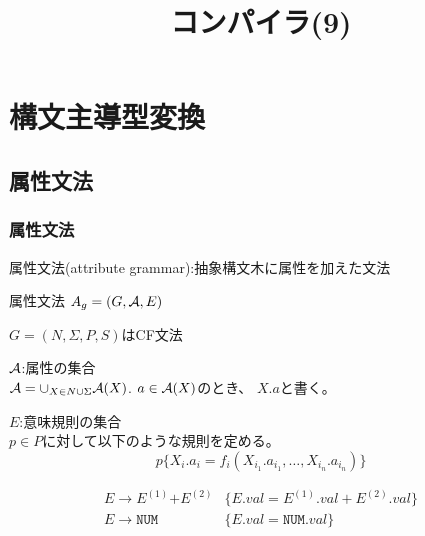 \documentclass[dvipdfmx]{beamer}
\title{コンパイラ(9)}
\date{\lecturedate}
\begin{document}
\frame{\titlepage}

\section{構文主導型変換}

\subsection{属性文法}

\begin{frame}
  \frametitle{属性文法}

  属性文法(attribute grammar):抽象構文木に属性を加えた文法


  属性文法 $A_g=(G,{\cal A},E)$
  \begin{list}{}{}
    \item $G=(N,\Sigma,P,S)$はCF文法
    \item ${\cal A}$:属性の集合\\
          ${\cal A}=\cup_{X\in
              N\cup\Sigma}{\cal A}(X)$.  $a\in{\cal A}(X)$のとき、
          $X.a$と書く。
    \item $E$:意味規則の集合\\
          $p\in P$に対して以下のような規則を定める。
          \[
            p\{X_i.a_i=f_i(X_{i_1}.a_{i_1},\ldots,X_{i_n}.a_{i_n})\}
          \]
  \end{list}

  \[\begin{array}{ll}
      E\rightarrow E^{(1)}\texttt{+}E^{(2)} & \{E.val=E^{(1)}.val+E^{(2)}.val\} \\
      E\rightarrow \texttt{NUM}             & \{E.val=\texttt{NUM}.val\}
    \end{array}
  \]

\end{frame}
\end{document}
